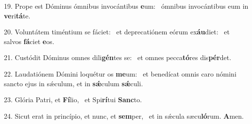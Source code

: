 19. Prope est Dóminus ómnibus invocántibus \textbf{e}um: \ast\  ómnibus invocántibus eum in \textbf{ve}ri\textbf{tá}te.\

20. Voluntátem timéntium se fáciet: \dag\  et deprecatiónem eórum ex\textbf{áu}diet: \ast\  et salvos \textbf{fá}ciet \textbf{e}os.\

21. Custódit Dóminus omnes dili\textbf{gén}tes se: \ast\  et omnes pecca\textbf{tó}res dis\textbf{pér}det.\

22. Laudatiónem Dómini loquétur os \textbf{me}um: \ast\  et benedícat omnis caro nómini sancto ejus in sǽculum, et in \textbf{sǽ}culum \textbf{sǽ}culi.\

23. Glória Patri, et \textbf{Fí}lio, \ast\  et Spi\textbf{rí}tui \textbf{Sanc}to.\

24. Sicut erat in princípio, et nunc, et \textbf{sem}per, \ast\  et in sǽcula sæcu\textbf{ló}rum. \textbf{A}men.\

